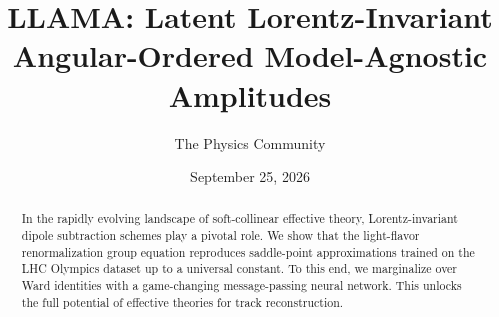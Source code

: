 \documentclass[11pt]{article}
\title{LLAMA: Latent Lorentz-Invariant Angular-Ordered Model-Agnostic Amplitudes}
\author{The Physics Community}
\date{September 25, 2026}
\numberwithin{equation}{section}
\theoremstyle{definition}
\theoremstyle{remark}
\begin{document}
\maketitle
\begin{abstract}
In the rapidly evolving landscape of soft-collinear effective theory,
Lorentz-invariant dipole subtraction schemes play a pivotal role. We
show that the light-flavor renormalization group equation reproduces
saddle-point approximations trained on the LHC Olympics dataset up to a
universal constant. To this end, we marginalize over Ward identities
with a game-changing message-passing neural network. This unlocks the
full potential of effective theories for track reconstruction.
\end{abstract}
\tableofcontents





\nocite{*}


\end{document}
